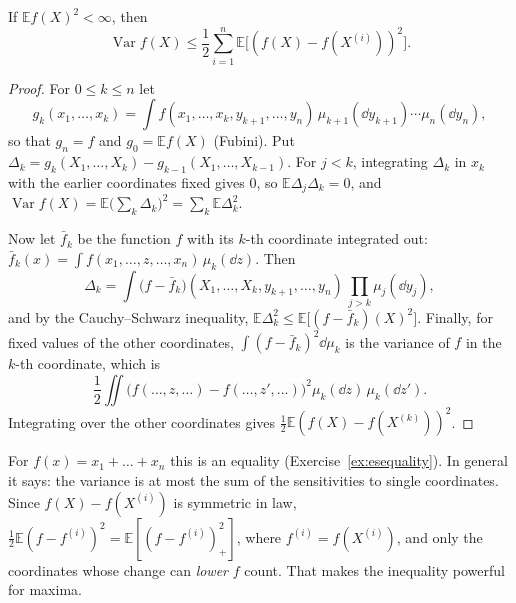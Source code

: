 \begin{theorem}\label{thm:efronstein}
If $\mathbb Ef(X)^2<\infty$, then
\[
\operatorname{Var}f(X)\le\frac12\sum_{i=1}^n\mathbb E\bigl[(f(X)-f(X^{(i)}))^2\bigr].
\]
\end{theorem}
\begin{proof}
For $0\le k\le n$ let
\[
g_k(x_1,\dots,x_k)=\int f(x_1,\dots,x_k,y_{k+1},\dots,y_n)\,\mu_{k+1}(\dd y_{k+1})\cdots\mu_n(\dd y_n),
\]
so that $g_n=f$ and $g_0=\mathbb Ef(X)$ (Fubini). Put $\Delta_k=g_k(X_1,\dots,X_k)-g_{k-1}(X_1,\dots,X_{k-1})$. For $j<k$, integrating $\Delta_k$ in $x_k$ with the earlier coordinates fixed gives $0$, so
$\mathbb E\Delta_j\Delta_k=0$, and $\operatorname{Var}f(X)=\mathbb E\bigl(\sum_k\Delta_k\bigr)^2=\sum_k\mathbb E\Delta_k^2$.

Now let $\bar f_k$ be the function $f$ with its $k$-th coordinate integrated out: $\bar f_k(x)=\int f(x_1,\dots,z,\dots,x_n)\,\mu_k(\dd z)$. Then
\[
\Delta_k=\int\bigl(f-\bar f_k\bigr)(X_1,\dots,X_k,y_{k+1},\dots,y_n)\,\prod_{j>k}\mu_j(\dd y_j),
\]
and by the Cauchy--Schwarz inequality,
$\mathbb E\Delta_k^2\le\mathbb E\bigl[(f-\bar f_k)(X)^2\bigr]$. Finally, for fixed values of the other coordinates, $\int(f-\bar f_k)^2\dd\mu_k$ is the variance of $f$ in the $k$-th
coordinate, which is
\[
\frac12\iint\bigl(f(\dots,z,\dots)-f(\dots,z',\dots)\bigr)^2\mu_k(\dd z)\,\mu_k(\dd z').
\]
Integrating over the other coordinates gives $\frac12\mathbb E(f(X)-f(X^{(k)}))^2$.
\end{proof}

For $f(x)=x_1+\dots+x_n$ this is an equality (Exercise~\ref{ex:esequality}). In general it says: the variance is at most the sum of the sensitivities to single coordinates.
Since $f(X)-f(X^{(i)})$ is symmetric in law, $\frac12\mathbb E(f-f^{(i)})^2=\mathbb E[(f-f^{(i)})_+^2]$, where $f^{(i)}=f(X^{(i)})$, and only the coordinates whose change can \emph{lower}
$f$ count. That makes the inequality powerful for maxima.


